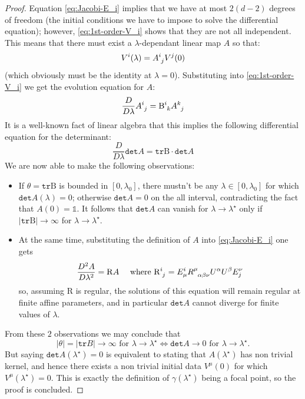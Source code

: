 \begin{proof}
		Equation \eqref{eq:Jacobi-E_i} implies that we have at most \(2(d - 2)\) degrees of freedom (the initial conditions we have to impose to solve the differential equation); however, \eqref{eq:1st-order-V_i} shows that they are not all independent. This means that there must exist a \(\lambda\)-dependant linear map \(A\) so that:
		\[
		V^i(\lambda) = A\indices{^i_j}V^j(0)
		\]
		(which obviously must be the identity at \(\lambda = 0\)). 
		Substituting into \eqref{eq:1st-order-V_i} we get the evolution equation for \(A\):
		\[
		\frac{D}{D\lambda}A\indices{^i_j} = \mathrm{B}\indices{^i_k}A\indices{^k_j}
		\]
		It is a well-known fact of linear algebra that this implies the following differential equation for the determinant: %
		\begin{equation}
		\label{eq;det-A}
			\frac{D}{D\lambda}\texttt{det}A = \texttt{tr}\mathrm{B}\cdot \texttt{det}A 
		\end{equation}
		We are now able to make the following observations:
		\begin{itemize}
			\item[\ding{99}] If \(\theta = \texttt{tr}\mathrm{B}\) is bounded in \([0, \lambda_0]\), there mustn't be any \(\lambda \in [0, \lambda_0]\) for which \(\texttt{det}A(\lambda) = 0\); otherwise \(\texttt{det}A = 0\) on the all interval, contradicting the fact that \(A(0) = \mathbb{1}\). It follows that \(\texttt{det}A\) can vanish for \(\lambda \rightarrow \lambda^{\star}\) only if \(\vert\texttt{tr}\mathrm{B}\vert \rightarrow \infty\) for \(\lambda \rightarrow \lambda^{\star}\).
			\item[\ding{99}] At the same time, substituting the definition of \(A\) into \eqref{eq:Jacobi-E_i} one gets
			\[
			\frac{D^2 A}{D\lambda^2} = \mathrm{R}A \quad \text{ where } \mathrm{R}\indices{^i_j} = E^i_{\mu}R\indices{^{\mu}_{\alpha\beta\nu}}U^{\alpha}U^{\beta}E_j^{\nu}
			\]
			so, assuming \(\mathrm{R}\) is regular, the solutions of this equation will remain regular at finite affine parameters, and in particular \(\texttt{det}A\) cannot diverge for finite values of \(\lambda\). 
		\end{itemize}
		From these \(2\) observations we may conclude that
		\[
		\vert\theta\vert = \vert\texttt{tr}B\vert \rightarrow \infty \text{ for } \lambda \rightarrow \lambda^{\star}\iff \texttt{det}A \rightarrow 0 \text{ for } \lambda \rightarrow \lambda^{\star}.
		\]
		But saying \(\texttt{det}A(\lambda^{\star}) = 0 \) is equivalent to stating that \(A(\lambda^{\star}) \) has non trivial kernel, and hence there exists a non trivial initial data \(V^{\mu}(0)\) for which \(V^{\mu}(\lambda^{\star}) = 0\). This is exactly the definition of \(\gamma(\lambda^{\star})\) being a focal point, so the proof is concluded.
	\end{proof}

